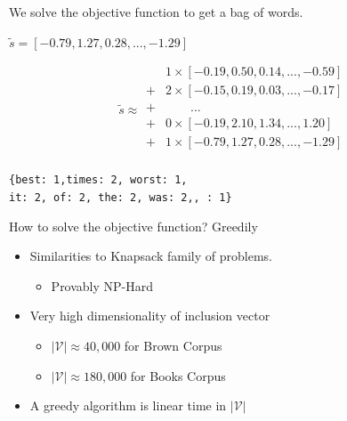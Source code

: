 \documentclass[]{beamer}
\newcommand{\iitem}[1]{\begin{itemize}
		\item #1
	\end{itemize}}
\newcommand{\s}{\tilde{s}}
\newcommand{\x}{\tilde{x}}
\newcommand{\V}{\mathcal{V}}
\newcommand{\B}{\mathcal{B}}
\begin{document}
\begin{frame}[fragile]{We solve the objective function to get a bag of words.}
	\vectorselectionproblemdefn
	\vfill
	\begin{description}
		\item<2->[Input Vector]  $\s=[−0.79, 1.27, 0.28, ..., −1.29]$
		\vfill
		\item<3->[Vector Selection] 
		\begin{equation*}
		\s \approx \begin{array}{ll}
		&1\times[−0.19, 0.50, 0.14, ..., −0.59]\\
		+&2\times[-0.15, 0.19, 0.03, ..., -0.17]\\
		+&\qquad...\\
		+&0\times[−0.19, 2.10, 1.34, ..., 1.20]\\
		+&1\times[−0.79, 1.27, 0.28, ..., −1.29]\\
		\end{array}
		\end{equation*}
		\vfill
		\item<4->[BOW] \texttt{\{best: 1,times: 2, worst: 1, \\it: 2, of: 2, the: 2, was: 2,, : 1\}}
	\end{description}
	\vfill

\end{frame}

\begin{frame}{How to solve the objective function? Greedily}
	\vectorselectionproblemdefn
		\vfill
	\begin{itemize}
		\item<1-> Similarities to Knapsack family of problems.
		\iitem{Provably NP-Hard} 
		\item<2-> Very high dimensionality of inclusion vector
		\begin{itemize}
			\item $|\V|\approx40,000$ for Brown Corpus
			\item $|\V|\approx180,000$ for Books Corpus
			\end{itemize}
		\item<3-> A greedy algorithm is linear time in $|\V|$ 
	\end{itemize}
	\vfill
\end{frame}

\newcommand{\vectorselectionproblemdefnalt}{Find the bag of vectors $\B$ (a multi-subset of $\V$), such that we have  $\min d(\s,\sum_{\x_a\in\B}\x_a)$}
\end{document}
